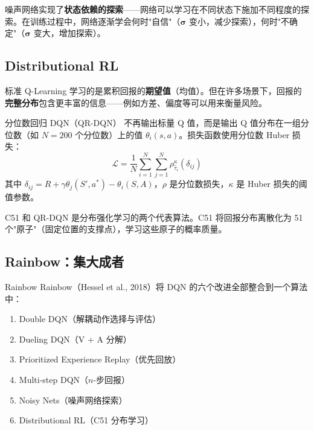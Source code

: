 噪声网络实现了\textbf{状态依赖的探索}——网络可以学习在不同状态下施加不同程度的探索。在训练过程中，网络逐渐学会何时"自信"（$\boldsymbol{\sigma}$ 变小，减少探索），何时"不确定"（$\boldsymbol{\sigma}$ 变大，增加探索）。

\subsection{Distributional RL}

标准 Q-Learning 学习的是累积回报的\textbf{期望值}（均值）。但在许多场景下，回报的\textbf{完整分布}包含更丰富的信息——例如方差、偏度等可以用来衡量风险。

\begin{mydefinition}{分位数回归 DQN（QR-DQN）}
不再输出标量 Q 值，而是输出 Q 值分布在一组分位数（如 $N=200$ 个分位数）上的值 $\theta_i(s,a)$。损失函数使用分位数 Huber 损失：
$$\mathcal{L} = \frac{1}{N}\sum_{i=1}^{N}\sum_{j=1}^{N} \rho_{\hat{\tau}_i}^{\kappa}\left( \delta_{ij} \right)$$
其中 $\delta_{ij} = R + \gamma \theta_j(S', a^*) - \theta_i(S,A)$，$\rho$ 是分位数损失，$\kappa$ 是 Huber 损失的阈值参数。
\end{mydefinition}

C51 和 QR-DQN 是分布强化学习的两个代表算法。C51 将回报分布离散化为 51 个"原子"（固定位置的支撑点），学习这些原子的概率质量。

\subsection{Rainbow：集大成者}

\begin{mydefinition}{Rainbow}
Rainbow（Hessel et al., 2018）将 DQN 的六个改进全部整合到一个算法中：
\begin{enumerate}
    \item Double DQN（解耦动作选择与评估）
    \item Dueling DQN（V + A 分解）
    \item Prioritized Experience Replay（优先回放）
    \item Multi-step DQN（$n$-步回报）
    \item Noisy Nets（噪声网络探索）
    \item Distributional RL（C51 分布学习）
\end{enumerate}
\end{mydefinition}

